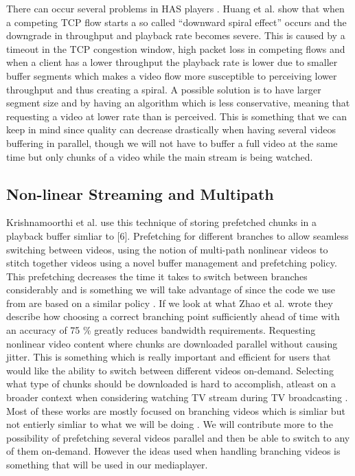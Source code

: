 \documentclass[9pt,a4paper]{acmproc}
\begin{document}
There can occur several problems in HAS players \cite{qualbranch}. Huang et al. \cite{streamrate} show that when a competing TCP flow starts a so called “downward spiral effect” occurs and the downgrade in throughput and playback rate becomes severe. This is caused by a timeout in the TCP congestion window, high packet loss in competing flows and when a client has a lower throughput the playback rate is lower due to smaller buffer segments which makes a video flow more susceptible to perceiving lower throughput and thus creating a spiral. A possible solution is to have larger segment size and by having an algorithm which is less conservative, meaning that requesting a video at lower rate than is perceived. This is something that we can keep in mind since quality can decrease drastically when having several videos buffering in parallel, though we will not have to buffer a full video at the same time but only chunks of a video while the main stream is being watched.

\subsection{Non-linear Streaming and Multipath}
Krishnamoorthi et al. \cite{hasmultipath} use this technique of storing prefetched chunks in a playback buffer simliar to [6]. Prefetching for different branches to allow seamless switching between videos, using the notion of multi-path nonlinear videos to stitch together videos using a novel buffer management and prefetching policy. This prefetching decreases the time it takes to switch between branches considerably and is something we will take advantage of since the code we use from \cite{qualbranch} are based on a similar policy \cite{hasmultipath}. If we look at what Zhao et al. \cite{scalableOnDemand} wrote they describe how choosing a correct branching point sufficiently ahead of time with an accuracy of 75 \% greatly reduces bandwidth requirements. Requesting nonlinear video content where chunks are downloaded parallel without causing jitter. This is something which is really important and efficient for users that would like the ability to switch between different videos on-demand. Selecting what type of chunks should be downloaded is hard to accomplish, atleast on a broader context when considering watching TV stream during TV broadcasting \cite{scalableOnDemand}. Most of these works are mostly focused on branching videos which is simliar but not entierly simliar to what we will be doing \cite{qualbranch, hasmultipath,scalableOnDemand}. We will contribute more to the possibility of prefetching several videos parallel and then be able to switch to any of  them on-demand. However the ideas used when handling branching videos is something that will be used in our mediaplayer.
\end{document}
